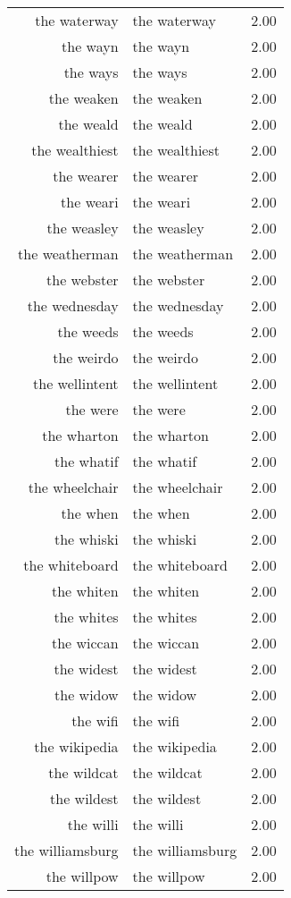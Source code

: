 \begin{table}[ht]
\begin{tabular}{rlr}
  the waterway & the waterway & 2.00 \\ 
  the wayn & the wayn & 2.00 \\ 
  the ways & the ways & 2.00 \\ 
  the weaken & the weaken & 2.00 \\ 
  the weald & the weald & 2.00 \\ 
  the wealthiest & the wealthiest & 2.00 \\ 
  the wearer & the wearer & 2.00 \\ 
  the weari & the weari & 2.00 \\ 
  the weasley & the weasley & 2.00 \\ 
  the weatherman & the weatherman & 2.00 \\ 
  the webster & the webster & 2.00 \\ 
  the wednesday & the wednesday & 2.00 \\ 
  the weeds & the weeds & 2.00 \\ 
  the weirdo & the weirdo & 2.00 \\ 
  the wellintent & the wellintent & 2.00 \\ 
  the were & the were & 2.00 \\ 
  the wharton & the wharton & 2.00 \\ 
  the whatif & the whatif & 2.00 \\ 
  the wheelchair & the wheelchair & 2.00 \\ 
  the when & the when & 2.00 \\ 
  the whiski & the whiski & 2.00 \\ 
  the whiteboard & the whiteboard & 2.00 \\ 
  the whiten & the whiten & 2.00 \\ 
  the whites & the whites & 2.00 \\ 
  the wiccan & the wiccan & 2.00 \\ 
  the widest & the widest & 2.00 \\ 
  the widow & the widow & 2.00 \\ 
  the wifi & the wifi & 2.00 \\ 
  the wikipedia & the wikipedia & 2.00 \\ 
  the wildcat & the wildcat & 2.00 \\ 
  the wildest & the wildest & 2.00 \\ 
  the willi & the willi & 2.00 \\ 
  the williamsburg & the williamsburg & 2.00 \\ 
  the willpow & the willpow & 2.00 \\ 

\end{tabular}
\end{table}
